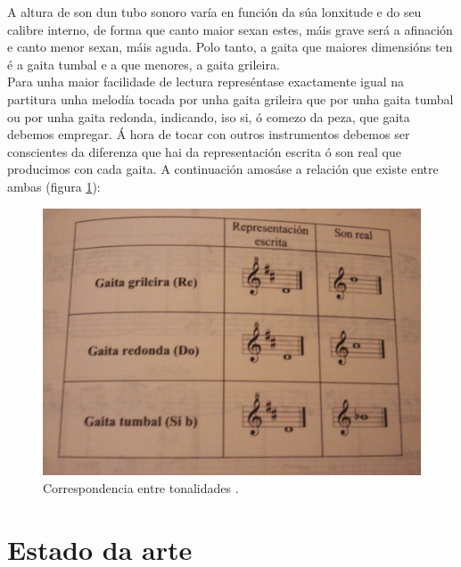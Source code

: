  A altura de son dun tubo sonoro varía en función da súa lonxitude e do seu
 calibre interno, de forma que canto maior sexan estes, máis grave será a
 afinación e canto menor sexan, máis aguda. Polo tanto, a gaita que maiores
 dimensións ten é a gaita tumbal e a que menores, a gaita grileira. \\

 Para unha maior facilidade de lectura represéntase exactamente igual na
 partitura unha melodía tocada por unha gaita grileira que por unha gaita
 tumbal ou por unha gaita redonda, indicando, iso si, ó comezo da peza, que
 gaita debemos empregar. Á hora de tocar con outros instrumentos debemos ser
 conscientes da diferenza que hai da representación escrita ó son real que
 producimos con cada gaita. A continuación amosáse a relación que existe entre
 ambas \cite{BrunoVillamorCaderno18} (figura
 \ref{figura:BrunoVillamorTonalidade}): \\

 \begin{figure}[htbp]
  \centering
  \includegraphics[scale=0.1,keepaspectratio=true]{./imagenes/bruno-villamor-tonalidade.jpg}
  \caption[Correspondencia entre tonalidades]{Correspondencia entre tonalidades \cite{BrunoVillamorCaderno18}.}
  \label{figura:BrunoVillamorTonalidade}
 \end{figure}

\section{Estado da arte}

